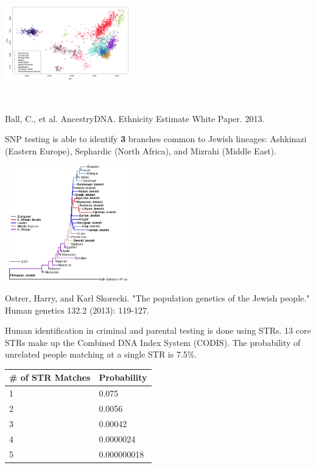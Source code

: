 \documentclass[hyperref,openany, oneside]{labbook} %
\begin{document}
\begin{center}
	\includegraphics[height=5cm, width=5.5cm]{kollel_1.png}\\
	\begin{tiny}
		Ball, C., et al. AncestryDNA. Ethnicity Estimate White Paper. 2013.
	\end{tiny}
\end{center}

SNP testing is able to identify \textbf{3} branches common to Jewish lineages: Ashkinazi (Eastern Europe), Sephardic (North Africa), and Mizrahi (Middle East). 

\begin{center}
	\includegraphics[height=5cm, width=5.5cm]{treejew.jpg}\\
	\begin{tiny}
		Ostrer, Harry, and Karl Skorecki. "The population genetics of the Jewish people." Human genetics 132.2 (2013): 119-127.
	\end{tiny}
\end{center}

\vspace{-0.3cm}
\vspace{-0.2cm}
Human identification in criminal and parental testing is done using STRs. 13 core STRs make up the Combined DNA Index System (CODIS). The probability of unrelated people matching at a single STR is 7.5\%. \\
\vspace{-0.2cm}
\begin{table}[!htbp]
	\centering
	\begin{tabular}{|l|l|}
		\hline
		\# of STR Matches & Probability \\ \hline
		1 & 0.075 \\ \hline
		2 & 0.0056 \\ \hline
		3 & 0.00042 \\ \hline
		4 & 0.0000024 \\ \hline
		5 & 0.000000018 \\ \hline
	\end{tabular}
\end{table}
\end{document}

